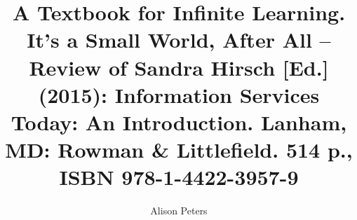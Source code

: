 
\fancyhead[R]{\thepage} %

\title{\LARGE{A Textbook for Infinite Learning. It’s a Small World, After All – Review of Sandra Hirsch [Ed.] (2015): Information Services Today: An Introduction. Lanham, MD: Rowman \& Littlefield. 514 p., ISBN 978-1-4422-3957-9}} %
\author{Alison Peters} %

\setcounter{page}{63}